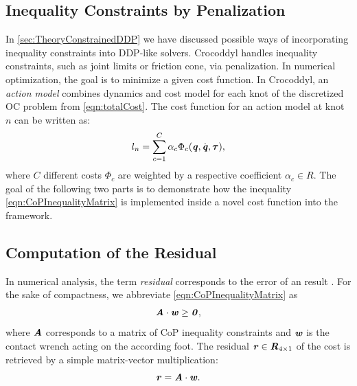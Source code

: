 \subsection{Inequality Constraints by Penalization}
In \cref{sec:TheoryConstrainedDDP} we have discussed possible ways of incorporating inequality constraints into DDP-like solvers. Crocoddyl handles inequality constraints, such as joint limits or friction cone, via penalization. 
In numerical optimization, the goal is to minimize a given cost function. In Crocoddyl, an \textit{action model} combines dynamics and cost model for each knot of the discretized \gls{OC} problem from \cref{eqn:totalCost}. The cost function for an action model at knot $n$ can be written as: 
\begin{equation}\label{eqn:costSum}
l_n=\sum_{c=1}^{C}\alpha_c\Phi_c(\bm{\mathit{q}},\dot{\bm{\mathit{q}}}, \bm{\mathit{\tau}}), 
\end{equation}
where $C$ different costs $\Phi_c$ are weighted by a respective coefficient $\alpha_c\in R$. The goal of the following two parts is to demonstrate how the inequality \cref{eqn:CoPInequalityMatrix} is implemented inside a novel cost function into the framework.

\subsection{Computation of the Residual}
In numerical analysis, the term \textit{residual} corresponds to the error of an result \cite{shewchuk1994introduction}. For the sake of compactness, we abbreviate \cref{eqn:CoPInequalityMatrix} as 
\begin{equation} \label{eqn:costPositive}
\bm{\mathit{A}} \cdot \bm{\mathit{w}} \geq \bm{\mathit{0}},
\end{equation}
where $\bm{\mathit{A}}$ corresponds to a matrix of \gls{CoP} inequality constraints and $\bm{\mathit{w}}$ is the contact wrench acting on the according foot. The residual $\bm{\mathit{r}}\in \bm{\mathit{R}}_{4\times 1}$ of the cost is retrieved by a simple matrix-vector multiplication:
\begin{equation}\label{eqn:costResidual}
\bm{\mathit{r}} = \bm{\mathit{A}} \cdot \bm{\mathit{w}}.
\end{equation} 

